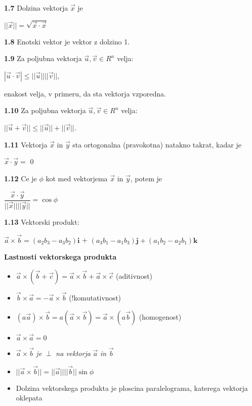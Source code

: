 \documentclass{article}
\begin{document}
\begin{multicols}{4}
\textbf{1.7} Dolzina vektorja $\vec{x}$ je
\begin{center}
    $||\vec{x}|| = \sqrt{\vec{x} \cdot \vec{x}}$
\end{center}

\textbf{1.8} Enotski vektor je vektor z dolzino 1.

\textbf{1.9} Za poljubna vektorja $\vec{u}, \vec{v} \in R^{n}$ velja:
\begin{center}
    $|\vec{u} \cdot \vec{v}| \leq ||\vec{u}||||\vec{v}||$,
\end{center}
enakost velja, v primeru, da sta vektorja vzporedna.


\textbf{1.10} Za poljubna vektorja $\vec{u}, \vec{v} \in R^{n}$ velja:
\begin{center}
    $||\vec{u} + \vec{v}|| \leq ||\vec{u}||+||\vec{v}||$.
\end{center}

\textbf{1.11} Vektorja $\vec{x}$ in $\vec{y}$ sta ortogonalna
(pravokotna) natakno takrat, kadar je
\begin{center}
    $\vec{x} \cdot \vec{y} = $ 0    
\end{center}

\textbf{1.12} Ce je $\phi$ kot med vektorjema $\vec{x}$ in $\vec{y}$, potem je
\begin{center}
    $\dfrac{\vec{x} \cdot \vec{y}}{||\vec{x}|| ||\vec{y}||} =
    \cos \phi$
\end{center}

\textbf{1.13} Vektorski produkt:
\begin{center}
    $\vec{a} \times \vec{b} = (a_{2}b_{3} - a_{3}b_{2}) \textbf{i}$ +
    $(a_{3}b_{1} - a_{1}b_{3}) \textbf{j} + (a_{1}b_{2} - a_{2}b_{1}) \textbf{k}$
\end{center}

\textbf{Lastnosti vektorskega produkta}
\begin{itemize}
    \item $\vec{a} \times (\vec{b} + \vec{c}) = \vec{a} \times \vec{b} + \vec{a} \times \vec{c}$ (aditivnost)
    \item $\vec{b} \times \vec{a} = -\vec{a} \times \vec{b}$ (!komutativnost)
    \item $ (a \vec{a}) \times \vec{b} = a(\vec{a} \times \vec{b}) =  \vec{a} \times (a \vec{b})$ (homogenost)
    \item $\vec{a} \times \vec{a} = 0$
    \item $\vec{a} \times \vec{b}$  \textit{je}  $\perp$ \textit{na vektorja} $\vec{a}$ \textit{in} $\vec{b}$
    \item $||\vec{a} \times \vec{b}|| = ||\vec{a}|| ||\vec{b}|| \sin \phi$
    \item Dolzina vektorskega produkta je ploscina paralelograma, katerega vektorja oklepata 
\end{itemize}


\end{multicols}
\end{document}
